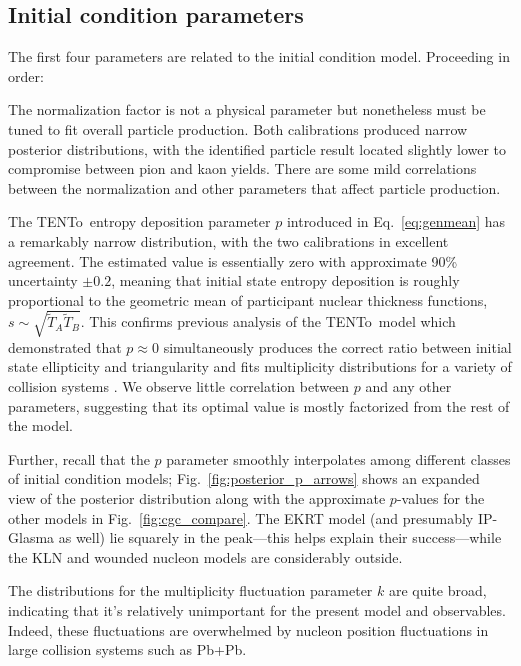 \documentclass[aps,prc,reprint,amsmath,nofootinbib]{revtex4-1}
\newcommand{\trento}{T\raisebox{-0.5ex}{R}ENTo}
\newcommand{\T}{\tilde{T}}
\begin{document}
\subsection{Initial condition parameters}

The first four parameters are related to the initial condition model.
Proceeding in order:

The normalization factor is not a physical parameter but nonetheless must be tuned to fit overall particle production.
Both calibrations produced narrow posterior distributions, with the identified particle result located slightly lower to compromise between pion and kaon yields.
There are some mild correlations between the normalization and other parameters that affect particle production.

The \trento\ entropy deposition parameter $p$ introduced in Eq.~\eqref{eq:genmean} has a remarkably narrow distribution, with the two calibrations in excellent agreement.
The estimated value is essentially zero with approximate 90\% uncertainty $\pm0.2$, meaning that initial state entropy deposition is roughly proportional to the geometric mean of participant nuclear thickness functions, $s \sim \sqrt{\T_A\T_B}$.
This confirms previous analysis of the \trento\ model which demonstrated that $p \approx 0$ simultaneously produces the correct ratio between initial state ellipticity and triangularity and fits multiplicity distributions for a variety of collision systems \cite{Moreland:2014oya}.
We observe little correlation between $p$ and any other parameters, suggesting that its optimal value is mostly factorized from the rest of the model.

Further, recall that the $p$ parameter smoothly interpolates among different classes of initial condition models;
Fig.~\ref{fig:posterior_p_arrows} shows an expanded view of the posterior distribution along with the approximate $p$-values for the other models in Fig.~\ref{fig:cgc_compare}.
The EKRT model (and presumably IP-Glasma as well) lie squarely in the peak---this helps explain their success---while the KLN and wounded nucleon models are considerably outside.

The distributions for the multiplicity fluctuation parameter $k$ are quite broad, indicating that it's relatively unimportant for the present model and observables.
Indeed, these fluctuations are overwhelmed by nucleon position fluctuations in large collision systems such as Pb+Pb.
\end{document}
